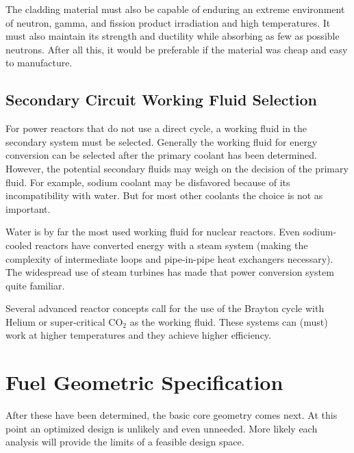 The cladding material must also be capable of enduring an extreme environment of neutron, gamma, and fission product irradiation and high temperatures. It must also maintain its strength and ductility while absorbing as few as possible neutrons. 
After all this, it would be preferable if the material was cheap and easy to manufacture.

\subsection{Secondary Circuit Working Fluid Selection}
For power reactors that do not use a direct cycle, a working fluid in the secondary system must be selected. Generally the working fluid for energy conversion can be selected after the primary coolant has been determined. 
However, the potential secondary fluids may weigh on the decision of the primary fluid.
For example, sodium coolant may be disfavored because of its incompatibility with water. 
But for most other coolants the choice is not as important. 

Water is by far the most used working fluid for nuclear reactors. Even sodium-cooled reactors have converted energy with a steam system (making the complexity of intermediate loops and pipe-in-pipe heat exchangers necessary). 
The widespread use of steam turbines has made that power conversion system quite familiar.

Several advanced reactor concepts call for the use of the Brayton cycle with Helium or super-critical CO$_2$ as the working fluid. These systems can (must) work at higher temperatures and they achieve higher efficiency.


\section{Fuel Geometric Specification}
After these have been determined, the basic core geometry comes next. 
At this point an optimized design is unlikely and even unneeded. More likely each analysis will provide the limits of a feasible design space. 

